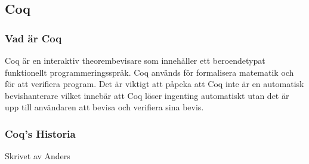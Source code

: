 \subsection{Coq}
\subsubsection{Vad är Coq}

Coq är en interaktiv theorembevisare som innehåller ett
beroendetypat funktionellt programmeringsspråk. Coq används för
formalisera matematik och för att verifiera program. Det är viktigt
att påpeka att Coq inte är en automatisk bevishanterare vilket innebär
att Coq löser ingenting automatiskt utan det är upp till användaren att
bevisa och verifiera sina bevis.

\subsubsection{Coq's Historia}
   Skrivet av Anders

